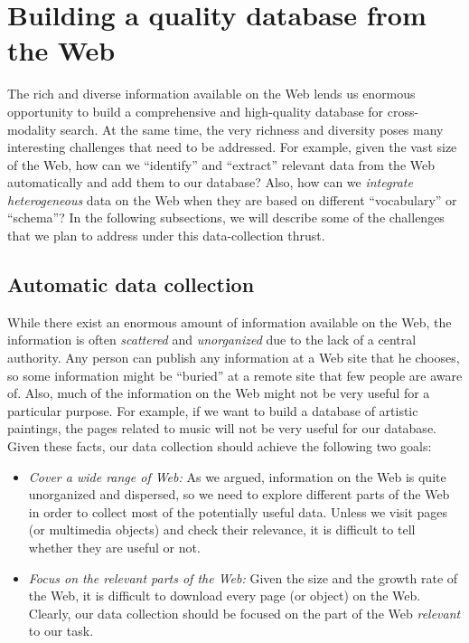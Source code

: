 \section{Building a quality database from the Web}
\newenvironment{tightenumerate}{\begin{list}{\labelenumi}{\usecounter{enumi}%
      \setlength{\topsep}{0.05in}%
      \setlength{\itemsep}{0.02in}%
      \setlength{\parsep}{0in}
      }}{\end{list}}


The rich and diverse information available on the Web lends us enormous
opportunity to build a comprehensive and high-quality 
database for cross-modality search. At the same time,
the very richness and diversity
poses many interesting challenges that need to be addressed.
For example, given the vast size of the Web, how can we 
``identify'' and ``extract'' relevant 
data from the Web automatically and add them to our database? 
Also, how can we {\em integrate} {\em heterogeneous} data on the Web
when they are based on different ``vocabulary'' or ``schema''?
In the following subsections,
we will describe some of the challenges that we plan
to address under this data-collection thrust.

\subsection{Automatic data collection}\label{sec:sampling}
While there exist an enormous amount of information available on the Web,
the information is often {\em scattered} and {\em unorganized}
due to the lack of a central authority. Any person can publish
any information at a Web site that he chooses, so some information
might be ``buried'' at a remote site that few people are aware of.
Also, much of the information on the Web might not be very useful
for a particular purpose. For example, if we want
to build a database of artistic paintings,
the pages related to music will not be very
useful for our database. Given these facts, our data collection
should achieve the following two goals:

\begin{itemize}
\item {\em Cover a wide range of Web:}
  As we argued, information on the Web is quite unorganized and dispersed,
  so we need to explore different parts of the
  Web in order to collect most of the potentially useful data.
  Unless we visit pages (or multimedia objects) and check their 
  relevance, it is difficult to tell whether they are useful or not.
\item {\em Focus on the relevant parts of the Web:}
  Given the size and the growth rate of the Web, it is difficult 
  to download every page (or object) on the Web. Clearly, 
  our data collection should be focused on the part of the 
  Web {\em relevant} to our task.
\end{itemize}

